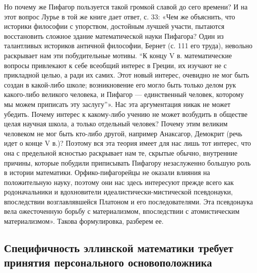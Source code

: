 Но почему же Пифагор пользуется такой громкой славой до сего времени?
И на этот вопрос Лурье в той же книге дает ответ, с. 33: «Чем же
объяснить, что историки философии с упорством, достойным лучшей
участи, пытаются восстановить сложное здание математической науки
Пифагора? Один из талантливых историков античной философии, Бернет (с.
111 его труда), невольно раскрывает нам эти побудительные мотивы. ``К
концу V в. математические вопросы привлекают к себе всеобщий интерес в
Греции, их изучают не с прикладной целью, а ради их самих. Этот новый
интерес, очевидно не мог быть создан в какой-либо школе; возникновение
его могло быть только делом рук какого-либо великого человека, и
Пифагор --- единственный человек, которому мы можем приписать эту
заслугу''». Нас эта аргументация никак не может убедить. Почему
интерес к какому-либо учению не может возбудить в обществе целая
научная школа, а только отдельный человек? Почему этим великим
человеком не мог быть кто-либо другой, например Анаксагор, Демокрит
(речь идет о конце V в.)? Поэтому вся эта теория имеет для нас лишь
тот интерес, что она с предельной ясностью раскрывает нам те, скрытые
обычно, внутренние причины, которые побудили приписывать Пифагору
незаслуженно большую роль в истории математики. Орфико-пифагорейцы не
оказали влияния на положительную науку, поэтому они нас здесь
интересуют прежде всего как родоначальники и вдохновители
идеалистически-мистической псевдонауки, впоследствии возглавлявшейся
Платоном и его последователями. Эта псевдонаука вела ожесточенную
борьбу с материализмом, впоследствии с атомистическим материализмом».
Такова формулировка, разберем ее.

\subsection{Специфичность эллинской математики требует принятия
персонального основоположника}

